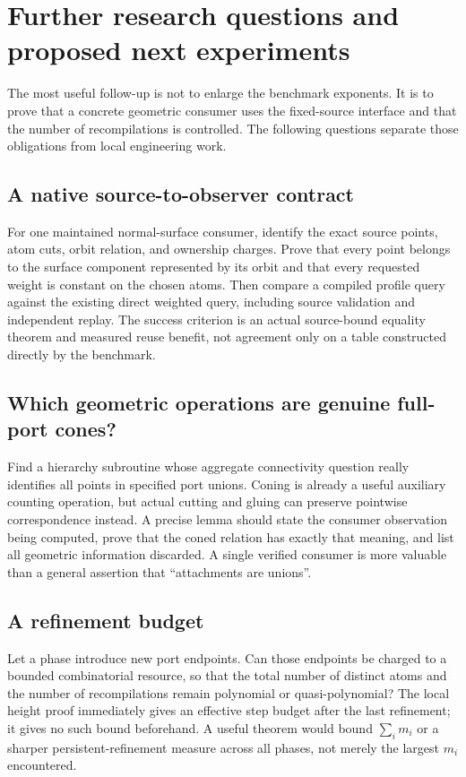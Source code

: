 \section{Further research questions and proposed next experiments}
\label{sec:research}

The most useful follow-up is not to enlarge the benchmark exponents. It is
to prove that a concrete geometric consumer uses the fixed-source interface
and that the number of recompilations is controlled. The following questions
separate those obligations from local engineering work.

\subsection{A native source-to-observer contract}

For one maintained normal-surface consumer, identify the exact source points,
atom cuts, orbit relation, and ownership charges. Prove that every point
belongs to the surface component represented by its orbit and that every
requested weight is constant on the chosen atoms. Then compare a compiled
profile query against the existing direct weighted query, including source
validation and independent replay. The success criterion is an actual
source-bound equality theorem and measured reuse benefit, not agreement
only on a table constructed directly by the benchmark.

\subsection{Which geometric operations are genuine full-port cones?}

Find a hierarchy subroutine whose aggregate connectivity question really
identifies all points in specified port unions. Coning is already a useful
auxiliary counting operation, but actual cutting and gluing can preserve
pointwise correspondence instead. A precise lemma should state the consumer
observation being computed, prove that the coned relation has exactly that
meaning, and list all geometric information discarded. A single verified
consumer is more valuable than a general assertion that ``attachments are
unions''.

\subsection{A refinement budget}

Let a phase introduce new port endpoints. Can those endpoints be charged
to a bounded combinatorial resource, so that the total number of distinct
atoms and the number of recompilations remain polynomial or
quasi-polynomial? The local height proof immediately gives an effective
step budget after the last refinement; it gives no such bound beforehand.
A useful theorem would bound
$\sum_i m_i$ or a sharper persistent-refinement measure across all phases,
not merely the largest $m_i$ encountered.

